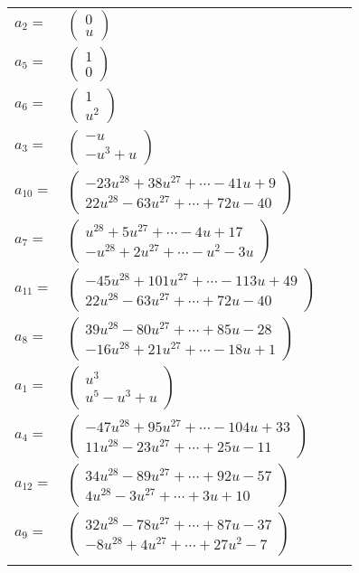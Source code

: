 \documentclass[1p]{elsarticle_modified}
\theoremstyle{definition}
\begin{document}
\begin{tabular}{m{7pt} m{180pt} m{7pt} m{180pt} }
\flushright $a_{2}=$&$\begin{pmatrix}0\\u\end{pmatrix}$ \\
\flushright $a_{5}=$&$\begin{pmatrix}1\\0\end{pmatrix}$ \\
\flushright $a_{6}=$&$\begin{pmatrix}1\\u^2\end{pmatrix}$ \\
\flushright $a_{3}=$&$\begin{pmatrix}- u\\- u^3+u\end{pmatrix}$ \\
\flushright $a_{10}=$&$\begin{pmatrix}-23 u^{28}+38 u^{27}+\cdots-41 u+9\\22 u^{28}-63 u^{27}+\cdots+72 u-40\end{pmatrix}$ \\
\flushright $a_{7}=$&$\begin{pmatrix}u^{28}+5 u^{27}+\cdots-4 u+17\\- u^{28}+2 u^{27}+\cdots- u^2-3 u\end{pmatrix}$ \\
\flushright $a_{11}=$&$\begin{pmatrix}-45 u^{28}+101 u^{27}+\cdots-113 u+49\\22 u^{28}-63 u^{27}+\cdots+72 u-40\end{pmatrix}$ \\
\flushright $a_{8}=$&$\begin{pmatrix}39 u^{28}-80 u^{27}+\cdots+85 u-28\\-16 u^{28}+21 u^{27}+\cdots-18 u+1\end{pmatrix}$ \\
\flushright $a_{1}=$&$\begin{pmatrix}u^3\\u^5- u^3+u\end{pmatrix}$ \\
\flushright $a_{4}=$&$\begin{pmatrix}-47 u^{28}+95 u^{27}+\cdots-104 u+33\\11 u^{28}-23 u^{27}+\cdots+25 u-11\end{pmatrix}$ \\
\flushright $a_{12}=$&$\begin{pmatrix}34 u^{28}-89 u^{27}+\cdots+92 u-57\\4 u^{28}-3 u^{27}+\cdots+3 u+10\end{pmatrix}$ \\
\flushright $a_{9}=$&$\begin{pmatrix}32 u^{28}-78 u^{27}+\cdots+87 u-37\\-8 u^{28}+4 u^{27}+\cdots+27 u^2-7\end{pmatrix}$\\&\end{tabular}
\end{document}

